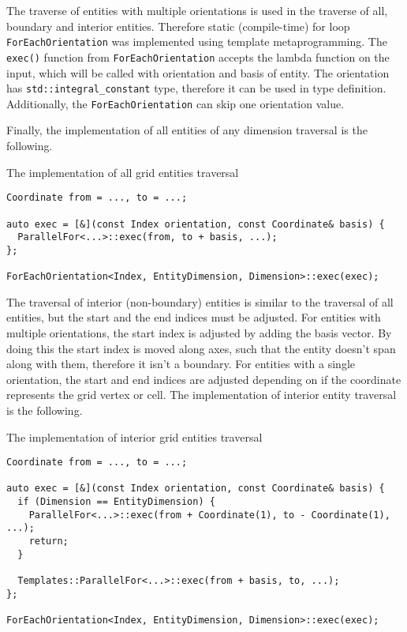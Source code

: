 The traverse of entities with multiple orientations is used in the traverse of all, boundary and interior entities.
Therefore static (compile-time) for loop \texttt{ForEachOrientation} was implemented using template metaprogramming.
The \texttt{exec()} function from \texttt{ForEachOrientation} accepts the lambda function on the input, which will be called with orientation and basis of entity.
The orientation has \texttt{std::integral\_constant} type, therefore it can be used in type definition.
Additionally, the \texttt{ForEachOrientation} can skip one orientation value.

Finally, the implementation of all entities of any dimension traversal is the following.

\vspace{8pt}

\begin{listing}[!h]
\caption{The implementation of all grid entities traversal}
\begin{verbatim}
Coordinate from = ..., to = ...;

auto exec = [&](const Index orientation, const Coordinate& basis) {
  ParallelFor<...>::exec(from, to + basis, ...);
};

ForEachOrientation<Index, EntityDimension, Dimension>::exec(exec);
\end{verbatim}
\end{listing}

\vspace{8pt}

The traversal of interior (non-boundary) entities is similar to the traversal of all entities, but the start and the end indices must be adjusted.
For entities with multiple orientations, the start index is adjusted by adding the basis vector.
By doing this the start index is moved along axes, such that the entity doesn't span along with them, therefore it isn't a boundary.
For entities with a single orientation, the start and end indices are adjusted depending on if the coordinate represents the grid vertex or cell.
The implementation of interior entity traversal is the following.

\begin{listing}[!h]
\caption{The implementation of interior grid entities traversal}
\begin{verbatim}
Coordinate from = ..., to = ...;

auto exec = [&](const Index orientation, const Coordinate& basis) {
  if (Dimension == EntityDimension) {
    ParallelFor<...>::exec(from + Coordinate(1), to - Coordinate(1), ...);
    return;
  }

  Templates::ParallelFor<...>::exec(from + basis, to, ...);
};

ForEachOrientation<Index, EntityDimension, Dimension>::exec(exec);
\end{verbatim}
\end{listing}
\newpage

